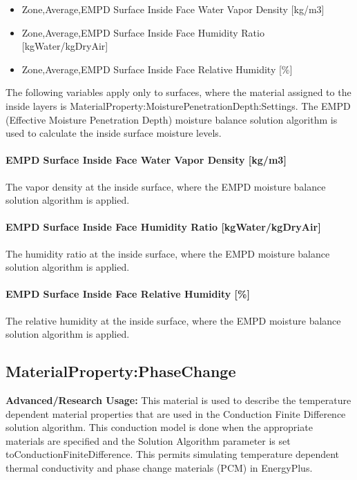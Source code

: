 \begin{itemize}
\item
  Zone,Average,EMPD Surface Inside Face Water Vapor Density {[}kg/m3{]}
\item
  Zone,Average,EMPD Surface Inside Face Humidity Ratio {[}kgWater/kgDryAir{]}
\item
  Zone,Average,EMPD Surface Inside Face Relative Humidity {[}\%{]}
\end{itemize}

The following variables apply only to surfaces, where the material assigned to the inside layers is MaterialProperty:MoisturePenetrationDepth:Settings. The EMPD (Effective Moisture Penetration Depth) moisture balance solution algorithm is used to calculate the inside surface moisture levels.

\paragraph{EMPD Surface Inside Face Water Vapor Density {[}kg/m3{]}}\label{empd-surface-inside-face-water-vapor-density-kgm3}

The vapor density at the inside surface, where the EMPD moisture balance solution algorithm is applied.

\paragraph{EMPD Surface Inside Face Humidity Ratio {[}kgWater/kgDryAir{]}}\label{empd-surface-inside-face-humidity-ratio-kgwaterkgdryair}

The humidity ratio at the inside surface, where the EMPD moisture balance solution algorithm is applied.

\paragraph{EMPD Surface Inside Face Relative Humidity {[}\%{]}}\label{empd-surface-inside-face-relative-humidity}

The relative humidity at the inside surface, where the EMPD moisture balance solution algorithm is applied.

\subsection{MaterialProperty:PhaseChange}\label{materialpropertyphasechange}

\textbf{Advanced/Research Usage:} This material is used to describe the temperature dependent material properties that are used in the Conduction Finite Difference solution algorithm. This conduction model is done when the appropriate materials are specified and the Solution Algorithm parameter is set toConductionFiniteDifference. This permits simulating temperature dependent thermal conductivity and phase change materials (PCM) in EnergyPlus.


